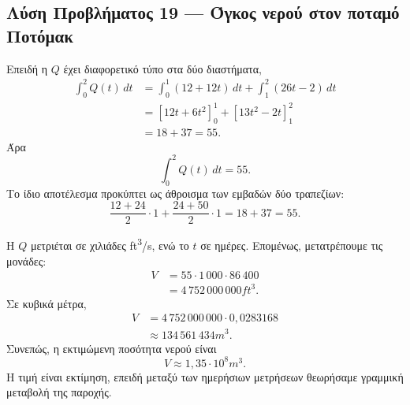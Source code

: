 \subsection*{Λύση Προβλήματος 19 --- Όγκος νερού στον ποταμό Ποτόμακ}

\begin{alist}
  \item Επειδή η $Q$ έχει διαφορετικό τύπο στα δύο διαστήματα,
        \begin{align*}
          \int_0^2 Q(t)\,dt
          &=\int_0^1(12+12t)\,dt
            +\int_1^2(26t-2)\,dt\\
          &=\left[12t+6t^2\right]_0^1
            +\left[13t^2-2t\right]_1^2\\
          &=18+37=55.
        \end{align*}
        Άρα
        \[
          {\int_0^2 Q(t)\,dt=55}.
        \]
        Το ίδιο αποτέλεσμα προκύπτει ως άθροισμα των εμβαδών δύο
        τραπεζίων:
        \[
          \frac{12+24}{2}\cdot1
          +\frac{24+50}{2}\cdot1=18+37=55.
        \]

  \item Η $Q$ μετριέται σε χιλιάδες \si{ft^3/s}, ενώ το $t$ σε ημέρες.
        Επομένως, μετατρέπουμε τις μονάδες:
        \begin{align*}
          V
          &=55\cdot1\,000\cdot86\,400\\
          &=4\,752\,000\,000\si{ft^3}.
        \end{align*}
        Σε κυβικά μέτρα,
        \begin{align*}
          V
          &=4\,752\,000\,000\cdot0{,}0283168\\
          &\approx134\,561\,434\si{m^3}.
        \end{align*}
        Συνεπώς, η εκτιμώμενη ποσότητα νερού είναι
        \[
          {V\approx1{,}35\cdot10^8\si{m^3}}.
        \]
        Η τιμή είναι εκτίμηση, επειδή μεταξύ των ημερήσιων μετρήσεων
        θεωρήσαμε γραμμική μεταβολή της παροχής.
\end{alist}
